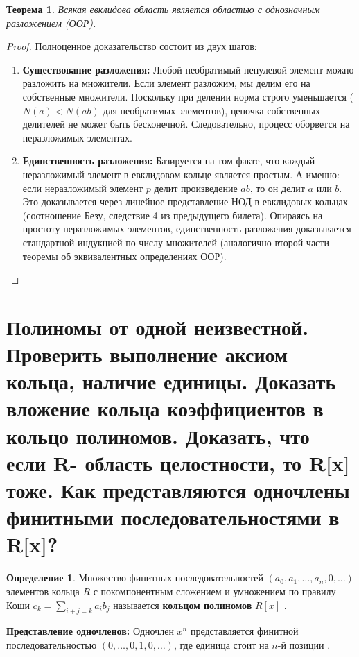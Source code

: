 \documentclass[12pt, a4paper]{article}
\theoremstyle{definition}
\newtheorem{definition}{Определение}[section]
\theoremstyle{plain}
\newtheorem{theorem}{Теорема}[section]
\begin{document}
	\begin{theorem}
		Всякая евклидова область является областью с однозначным разложением (ООР).
	\end{theorem}
	\begin{proof}
		Полноценное доказательство состоит из двух шагов:
		\begin{enumerate}
			\item \textbf{Существование разложения:} Любой необратимый ненулевой элемент можно разложить на множители. Если элемент разложим, мы делим его на собственные множители. Поскольку при делении норма строго уменьшается ($N(a) < N(ab)$ для необратимых элементов), цепочка собственных делителей не может быть бесконечной. Следовательно, процесс оборвется на неразложимых элементах.
			\item \textbf{Единственность разложения:} Базируется на том факте, что каждый неразложимый элемент в евклидовом кольце является простым. А именно: если неразложимый элемент $p$ делит произведение $ab$, то он делит $a$ или $b$. Это доказывается через линейное представление НОД в евклидовых кольцах (соотношение Безу, следствие 4 из предыдущего билета). Опираясь на простоту неразложимых элементов, единственность разложения доказывается стандартной индукцией по числу множителей (аналогично второй части теоремы об эквивалентных определениях ООР).
		\end{enumerate}
	\end{proof}
	
	\newpage
	\setcounter{section}{6}
	\section{Полиномы от одной неизвестной. Проверить выполнение аксиом кольца, наличие единицы. Доказать вложение кольца коэффициентов в кольцо полиномов. Доказать, что если R- область целостности, то R[x] тоже. Как представляются одночлены финитными последовательностями в R[x]?}
	
	\begin{definition}
		Множество финитных последовательностей $(a_0, a_1, \dots, a_n, 0, \dots)$ элементов кольца $R$ с покомпонентным сложением и умножением по правилу Коши $c_k = \sum_{i+j=k} a_i b_j$ называется \textbf{кольцом полиномов} $R[x]$ .
	\end{definition}
	
	\textbf{Представление одночленов:} Одночлен $x^n$ представляется финитной последовательностью $(0, \dots, 0, 1, 0, \dots)$, где единица стоит на $n$-й позиции .
	
\end{document}
